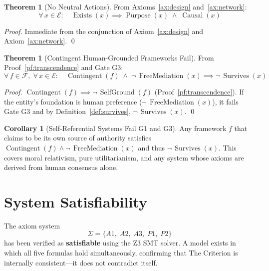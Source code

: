 \documentclass[11pt,a4paper]{article}
\theoremstyle{definition}
\newtheorem{theorem}[axiom]{Theorem}
\newtheorem{corollary}[axiom]{Corollary}
\newcommand{\E}{\mathcal{E}}      %
\newcommand{\F}{\mathcal{F}}      %
\newcommand{\Exists}{\operatorname{Exists}}
\newcommand{\Purpose}{\operatorname{Purpose}}
\newcommand{\Causal}{\operatorname{Causal}}
\newcommand{\Contingent}{\operatorname{Contingent}}
\newcommand{\SelfGround}{\operatorname{SelfGround}}
\newcommand{\FreeMediation}{\operatorname{FreeMediation}}
\newcommand{\Survives}{\operatorname{Survives}}
\begin{document}
\begin{theorem}[No Neutral Actions]
\label{thm:noneutral}
From Axioms~\ref{ax:design} and~\ref{ax:network}:
\begin{equation}
\forall\, x \in \E : \quad \Exists(x) \implies \Purpose(x) \;\land\; \Causal(x)
\end{equation}
\begin{proof}
Immediate from the conjunction of Axiom~\ref{ax:design} and Axiom~\ref{ax:network}. \qed
\end{proof}
\end{theorem}

\begin{theorem}[Contingent Human-Grounded Frameworks Fail]
\label{thm:contingent_fail}
From Proof~\ref{pf:transcendence} and Gate G3:
\begin{equation}
\forall\, f \in \F,\; \forall\, x \in \E : \quad
\Contingent(f) \;\land\; \lnot\,\FreeMediation(x) \implies \lnot\,\Survives(x)
\end{equation}
\begin{proof}
$\Contingent(f) \implies \lnot\,\SelfGround(f)$ (Proof~\ref{pf:transcendence}).
If the entity's foundation is human preference ($\lnot\,\FreeMediation(x)$),
it fails Gate G3 and by Definition~\ref{def:survives},
$\lnot\,\Survives(x)$. \qed
\end{proof}
\end{theorem}

\begin{corollary}[Self-Referential Systems Fail G1 and G3]
Any framework $f$ that claims to be its own source of authority
satisfies $\Contingent(f) \land \lnot\,\FreeMediation(x)$ and thus
$\lnot\,\Survives(x)$.  This covers moral relativism, pure utilitarianism,
and any system whose axioms are derived from human consensus alone.
\end{corollary}

\section{System Satisfiability}

The axiom system
\begin{equation}
\Sigma = \{A1,\; A2,\; A3,\; P1,\; P2\}
\end{equation}
has been verified as \textbf{satisfiable} using the Z3 SMT solver.  A model
exists in which all five formulas hold simultaneously, confirming that The
Criterion is internally consistent---it does not contradict itself.
\end{document}
